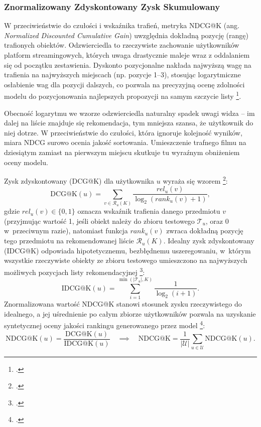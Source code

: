 \subsubsection{Znormalizowany Zdyskontowany Zysk Skumulowany}

W przeciwieństwie do czułości i wskaźnika trafień, metryka NDCG@K (ang. \foreignlanguage{english}{\textit{Normalized Discounted Cumulative Gain}}) uwzględnia dokładną pozycję (rangę) trafionych obiektów. Odzwierciedla to rzeczywiste zachowanie użytkowników platform streamingowych, których uwaga drastycznie maleje wraz z oddalaniem się od początku zestawienia. Dyskonto pozycjonalne nakłada najwyższą wagę na trafienia na najwyższych miejscach (np. pozycje 1–3), stosując logarytmiczne osłabienie wag dla pozycji dalszych, co pozwala na precyzyjną ocenę zdolności modelu do pozycjonowania najlepszych propozycji na samym szczycie listy \footcite{krawczukSystemyRekomendacyjne2024}.

Obecność logarytmu we wzorze odzwierciedla naturalny spadek uwagi widza -- im dalej na liście znajduje się rekomendacja, tym mniejsza szansa, że użytkownik do niej dotrze. W przeciwieństwie do czułości, która ignoruje kolejność wyników, miara NDCG surowo ocenia jakość sortowania. Umieszczenie trafnego filmu na dziesiątym zamiast na pierwszym miejscu skutkuje tu wyraźnym obniżeniem oceny modelu.

Zysk zdyskontowany (DCG@K) dla użytkownika $u$ wyraża się wzorem \footcite{oliveiraRankAggregationEffective2020}:
\begin{equation}
    \text{DCG@K}(u) = \sum_{v \in \mathcal{R}_u(K)} \frac{rel_u(v)}{\log_2(rank_u(v) + 1)},
\end{equation}
gdzie $rel_u(v) \in \{0, 1\}$ oznacza wskaźnik trafienia danego przedmiotu $v$ (przyjmując wartość 1, jeśli obiekt należy do zbioru testowego $\mathcal{T}_u$, oraz 0 w~przeciwnym razie), natomiast funkcja $rank_u(v)$ zwraca dokładną pozycję tego przedmiotu na rekomendowanej liście $\mathcal{R}_u(K)$. Idealny zysk zdyskontowany (IDCG@K) odpowiada hipotetycznemu, bezbłędnemu uszeregowaniu, w~którym wszystkie rzeczywiste obiekty ze zbioru testowego umieszczono na najwyższych możliwych pozycjach listy rekomendacyjnej \footcite[35]{krawczukSystemyRekomendacyjne2024}:
\begin{equation}
    \text{IDCG@K}(u) = \sum_{i=1}^{\min(|\mathcal{T}_u|, K)} \frac{1}{\log_2(i + 1)}.
\end{equation}
Znormalizowana wartość NDCG@K stanowi stosunek zysku rzeczywistego do idealnego, a jej uśrednienie po całym zbiorze użytkowników pozwala na uzyskanie syntetycznej oceny jakości rankingu generowanego przez model \footcite{oliveiraRankAggregationEffective2020}:
\begin{equation}
    \text{NDCG@K}(u) = \frac{\text{DCG@K}(u)}{\text{IDCG@K}(u)} \quad \implies \quad \text{NDCG@K} = \frac{1}{|\mathcal{U}|} \sum_{u \in \mathcal{U}} \text{NDCG@K}(u).
\end{equation}


